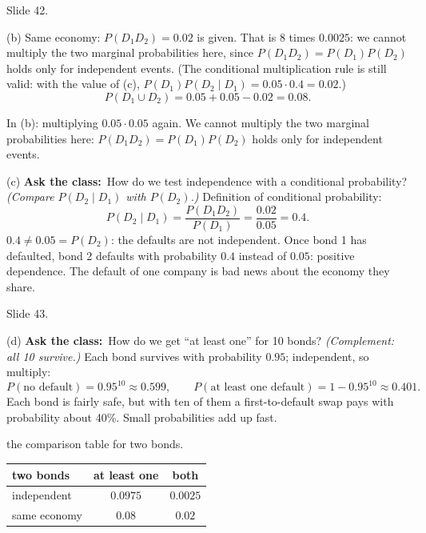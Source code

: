 \documentclass[11pt,a4paper,parskip=half]{scrartcl}
\newcommand{\ask}{\textbf{\color{navy}Ask the class:}\ }
\begin{document}
\begin{slidecue}
	Slide 42.
\end{slidecue}

(b) Same economy: $P(D_1D_2)=0.02$ is given. That is 8 times $0.0025$: we
cannot multiply the two marginal probabilities here, since
$P(D_1D_2)=P(D_1)P(D_2)$ holds only for independent events. (The
conditional multiplication rule is still valid: with the value of (c),
$P(D_1)P(D_2\mid D_1)=0.05\cdot0.4=0.02$.)
\[ P(D_1\cup D_2)=0.05+0.05-0.02=0.08. \]

\begin{mistake}
	In (b): multiplying $0.05\cdot0.05$ again. We cannot multiply the two
	marginal probabilities here: $P(D_1D_2)=P(D_1)P(D_2)$ holds only for
	independent events.
\end{mistake}

(c) \ask How do we test independence with a conditional probability?
\emph{(Compare $P(D_2\mid D_1)$ with $P(D_2)$.)} Definition of conditional
probability:
\[ P(D_2\mid D_1)=\frac{P(D_1D_2)}{P(D_1)}=\frac{0.02}{0.05}=0.4. \]
$0.4\ne0.05=P(D_2)$: the defaults are not independent. Once bond 1 has
defaulted, bond 2 defaults with probability $0.4$ instead of $0.05$:
positive dependence. The default of one company is bad news about the
economy they share.

\begin{slidecue}
	Slide 43.
\end{slidecue}

(d) \ask How do we get ``at least one'' for 10 bonds? \emph{(Complement:
all 10 survive.)} Each bond survives with probability $0.95$;
independent, so multiply:
\[ P(\text{no default})=0.95^{10}\approx0.599,\qquad
	P(\text{at least one default})=1-0.95^{10}\approx0.401. \]
Each bond is fairly safe, but with ten of them a first-to-default swap
pays with probability about 40\%. Small probabilities add up fast.

\needspace{0.15\textheight}
\begin{slidefig}
	the comparison table for two bonds.
	\begin{center}
		\begin{tabular}{lcc}
			two bonds    & at least one & both     \\ \hline
			independent  & $0.0975$     & $0.0025$ \\
			same economy & $0.08$       & $0.02$
		\end{tabular}
	\end{center}
\end{slidefig}
\end{document}
